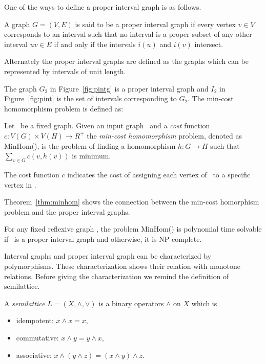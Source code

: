 One of the ways to define a proper interval graph is as follows.

\begin{defi}
A graph \(G=(V,E)\) is said to be a proper interval graph if every vertex \(v \in V\)
corresponds to an interval such that no interval is a proper subset of any other interval
\(uv \in E\) if and only if the intervals \(i(u)\) and \(i(v)\) intersect.
\end{defi}

Alternately the proper interval graphs are defined as the graphs which can be represented 
by intervals of unit length.

\begin{figure}[h]
\hfill
\subfigure[\ensuremath{G_2}]{\label{fig:pintg}}\hfill 
\subfigure[\ensuremath{I_2}]{\label{fig:pint}}\hfill 
\end{figure}

The graph \(G_2\) in Figure~\ref{fig:pintg} is a proper interval graph and
\(I_2\) in Figure~\ref{fig:pint} is the set of intervals corresponding to \(G_2\)\@.
The min-cost homomorphism problem is defined as:

\begin{defi} [MinHom]
Let \mH\ be a fixed graph. Given an input graph \mG\ and a \emph{cost} function
\(c: V(G) \times V(H) \to R^+\) the \emph{min-cost homomorphism} problem,
denoted as MinHom(\mH), is the problem of finding a homomorphism 
\(h:G\to H\) such that \(\sum_{v\in G} c(v, h(v))\) is minimum.
\end{defi}

The cost function \(c\) indicates the cost of assigning each vertex of \mG\ 
to a specific vertex in \mH\@. 

Theorem~\ref{thm:minhom} shows the connection between the min-cost homorphism problem 
and the proper interval graphs.

\begin{theorem} [TODO] \label{thm:minhom}
For any fixed reflexive graph \mH, the problem MinHom(\mH) is polynomial time solvable if
\mH\ is a proper interval graph and otherwise, it is NP-complete.
\end{theorem}

Interval graphs and proper interval graph can be characterized by polymorphisms. 
These characterization shows their relation with monotone relations. 
Before giving the characterization we remind the definition of semilattice.

\begin{defi} [Semilattice]
A \emph{semilattice} \(L=(X,\wedge,\vee)\) is a binary operators \(\wedge\) on \(X\) which is
\begin{itemize}
\item idempotent: \(x \wedge x = x\),
\item commutative: \(x \wedge y = y \wedge x\),
\item associative: \(x \wedge (y \wedge z) = (x \wedge y) \wedge z\).
\end{itemize}
\end{defi}

